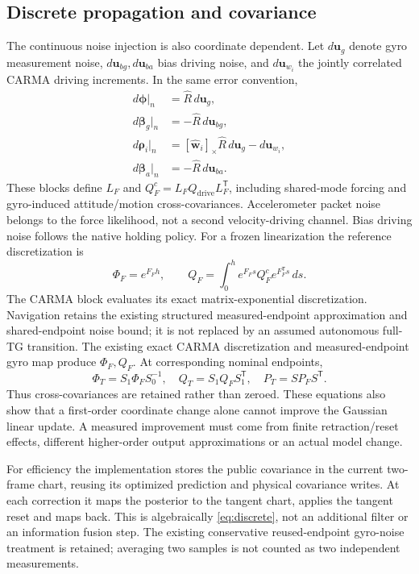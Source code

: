 \documentclass[conference]{IEEEtran}
\newcommand{\vc}[1]{\bm{#1}}
\newcommand{\sk}[1]{[#1]_\times}
\newcommand{\tr}{^{\mathsf T}}
\begin{document}
\subsection{Discrete propagation and covariance}
The continuous noise injection is also coordinate dependent. Let
$d\vc u_g$ denote gyro measurement noise, $d\vc u_{bg},d\vc u_{ba}$
bias driving noise, and $d\vc u_{w_i}$ the jointly correlated CARMA
driving increments. In the same error convention,
\begin{align}
 d\vc\phi\big|_n&=\hat R\,d\vc u_g,\\
 d\vc\beta_g\big|_n&=-\hat R\,d\vc u_{bg},\\
 d\vc\rho_i\big|_n&=\sk{\hat{\vc w}_i}\hat R\,d\vc u_g-d\vc u_{w_i},\\
 d\vc\beta_a\big|_n&=-\hat R\,d\vc u_{ba}.
\end{align}
These blocks define $L_F$ and
$Q_F^c=L_F Q_{\mathrm{drive}}L_F\tr$, including shared-mode forcing
and gyro-induced attitude/motion cross-covariances. Accelerometer packet
noise belongs to the force likelihood, not a second velocity-driving
channel. Bias driving noise follows the native holding policy.
For a frozen linearization the reference discretization is
\begin{equation}
 \Phi_F=e^{F_Fh},\qquad
 Q_F=\int_0^h e^{F_Fs}Q_F^c e^{F_F\tr s}\,ds.
\end{equation}
The CARMA block evaluates its exact matrix-exponential discretization.
Navigation retains the existing structured measured-endpoint
approximation and shared-endpoint noise bound; it is not replaced by an
assumed autonomous full-TG transition.
The existing exact CARMA discretization and measured-endpoint gyro map
produce $\Phi_F,Q_F$. At corresponding nominal endpoints,
\begin{equation}
 \Phi_T=S_1\Phi_F S_0^{-1},\quad Q_T=S_1Q_F S_1\tr,
 \quad P_T=S P_F S\tr.\label{eq:discrete}
\end{equation}
Thus cross-covariances are retained rather than zeroed. These equations
also show that a first-order coordinate change alone cannot improve the
Gaussian linear update. A measured improvement must come from finite
retraction/reset effects, different higher-order output approximations or
an actual model change.

For efficiency the implementation stores the public covariance in the
current two-frame chart, reusing its optimized prediction and physical
covariance writes. At each correction it maps the posterior to the tangent
chart, applies the tangent reset and maps back. This is algebraically
\cref{eq:discrete}, not an additional filter or an information fusion step.
The existing conservative reused-endpoint gyro-noise treatment is retained;
averaging two samples is not counted as two independent measurements.
\end{document}
